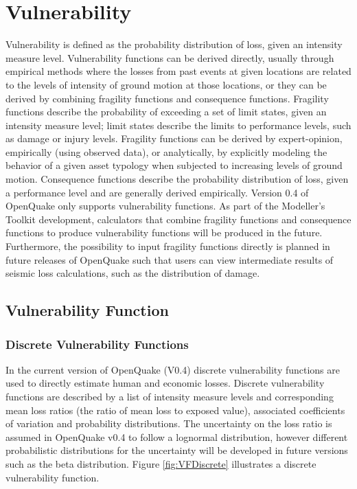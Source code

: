 \section{Vulnerability}
Vulnerability is defined as the probability distribution of loss, given an intensity measure level. Vulnerability functions can be derived directly, usually through empirical methods where the losses from past events at given locations are related to the levels of intensity of ground motion at those locations, or they can be derived by combining fragility functions and consequence functions. Fragility functions describe the probability of exceeding a set of limit states, given an intensity measure level; limit states describe the limits to performance levels, such as damage or injury levels. Fragility functions can be derived by expert-opinion, empirically (using observed data), or analytically, by explicitly modeling the behavior of a given asset typology when subjected to increasing levels of ground motion. Consequence functions describe the probability distribution of loss, given a performance level and are generally derived empirically. 
Version 0.4 of OpenQuake only supports vulnerability functions. As part of the Modeller's Toolkit development, calculators that combine fragility functions and consequence functions to produce vulnerability functions will be produced in the future. Furthermore, the possibility to input fragility functions directly is planned in future releases of OpenQuake such that users can view intermediate results of seismic loss calculations, such as the distribution of damage. 

\subsection{Vulnerability Function}
\subsubsection{Discrete Vulnerability Functions}
In the current version of OpenQuake (V0.4) discrete vulnerability functions are used to directly estimate human and economic losses. Discrete vulnerability functions are described by a list of intensity measure levels and corresponding mean loss ratios (the ratio of mean loss to exposed value), associated coefficients of variation and probability distributions. The uncertainty on the loss ratio is assumed in OpenQuake v0.4 to follow a lognormal distribution, however different probabilistic distributions for the uncertainty will be developed in future versions such as the beta distribution. Figure \ref{fig:VFDiscrete} illustrates a discrete vulnerability function.

